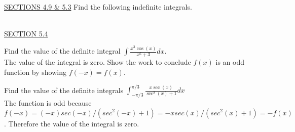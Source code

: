 \documentclass{exam}
\begin{document}
\begin{questions}
\ \\
\underline{SECTIONS 4.9 \& 5.3}
\question Find the following indefinite integrals.
  \begin{parts}
  \end{parts}



\ \\
\underline{SECTION 5.4}

\question Find the value of the definite integral $\displaystyle\int \frac{x^3\cos(x)}{x^6+3}dx$. 
\\ {\color{red} The value of the integral is zero.  Show the work to conclude $f(x)$ is an odd function by showing $f(-x)=f(x)$.}

\question Find the value of the definite integrals $\displaystyle\int_{-\pi/3}^{\pi/3} \frac{x\sec(x)}{\sec^2(x) + 1} dx$ \\ {\color{red} The function is odd because $f(-x) = (-x)sec(-x)/(sec^2(-x)+1) = -xsec(x)/(sec^2(x)+1) = -f(x)$.  Therefore the value of the integral is zero.}


\end{questions}
\end{document}
